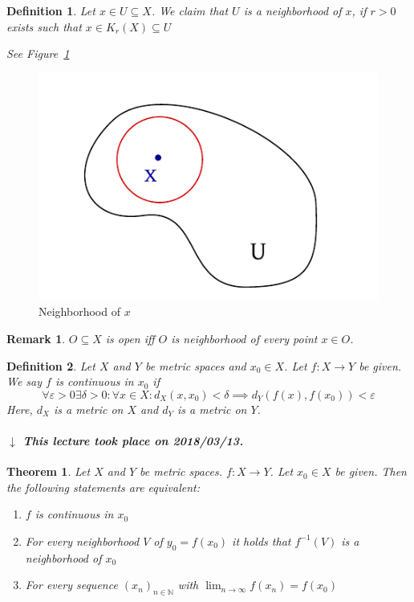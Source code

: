 \documentclass{article}
\newtheorem{theorem}{Theorem}  \numberwithin{theorem}{section}
\newtheorem{definition}{Definition}  \numberwithin{definition}{section}
\newtheorem{remark}{Remark}  \numberwithin{remark}{section}
\newcommand{\dateref}[1]{%
  \begin{mdframed}[backgroundcolor=gray!10,innerbottommargin=0pt,innertopmargin=0pt]
    \paragraph{\textit{$\downarrow$ This lecture took place on #1.}}%
  \end{mdframed}%
}
\begin{document}
\begin{definition}
  Let $x \in U \subseteq X$. We claim that $U$ is a neighborhood of $x$,
  if $r > 0$ exists such that $x \in K_r(X) \subseteq U$

  See Figure~\ref{img:neigh}
\end{definition}

\begin{figure}
  \begin{center}
    \includegraphics{img/06_neighborhood.pdf}
    \caption{Neighborhood of $x$}
    \label{img:neigh}
  \end{center}
\end{figure}

\begin{remark}
  $O \subseteq X$ is open iff $O$ is neighborhood of every point $x \in O$.
\end{remark}

\begin{definition}
  Let $X$ and $Y$ be metric spaces and $x_0 \in X$.
  Let $f: X \to Y$ be given. We say $f$ is continuous in $x_0$ if
  \[ \forall \varepsilon > 0 \exists \delta > 0: \forall x \in X: d_X(x, x_0) < \delta \implies d_Y(f(x), f(x_0)) < \varepsilon \]
  Here, $d_X$ is a metric on $X$ and $d_Y$ is a metric on $Y$.
\end{definition}

\dateref{2018/03/13}

\begin{theorem} %
  \label{satz3t}
  Let $X$ and $Y$ be metric spaces. $f: X \to Y$. Let $x_0 \in X$ be given.
  Then the following statements are equivalent:
  \begin{enumerate}
    \item $f$ is continuous in $x_0$
    \item For every neighborhood $V$ of $y_0 = f(x_0)$ it holds that $f^{-1}(V)$ is a neighborhood of $x_0$
    \item For every sequence $(x_n)_{n \in \mathbb N}$ with $\lim_{n\to\infty} f(x_n) = f(x_0)$
  \end{enumerate}
\end{theorem}
\end{document}

